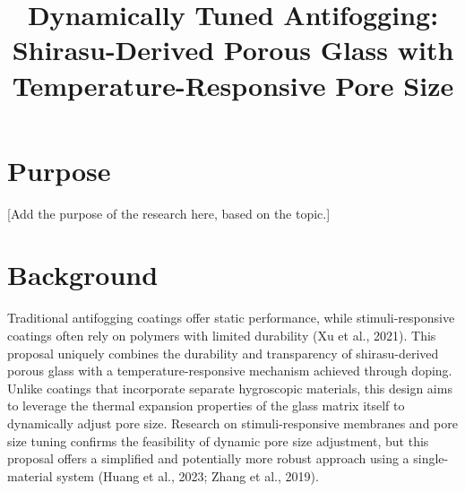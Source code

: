 \documentclass{article}
\title{Dynamically Tuned Antifogging: Shirasu-Derived Porous Glass with Temperature-Responsive Pore Size}
\author{}
\date{}
\begin{document}
\maketitle
\section{Purpose}
[Add the purpose of the research here, based on the topic.]

\section{Background}
Traditional antifogging coatings offer static performance, while stimuli-responsive coatings often rely on polymers with limited durability (Xu et al., 2021). This proposal uniquely combines the durability and transparency of shirasu-derived porous glass with a temperature-responsive mechanism achieved through doping. Unlike coatings that incorporate separate hygroscopic materials, this design aims to leverage the thermal expansion properties of the glass matrix itself to dynamically adjust pore size. Research on stimuli-responsive membranes and pore size tuning confirms the feasibility of dynamic pore size adjustment, but this proposal offers a simplified and potentially more robust approach using a single-material system (Huang et al., 2023; Zhang et al., 2019).
\end{document}
